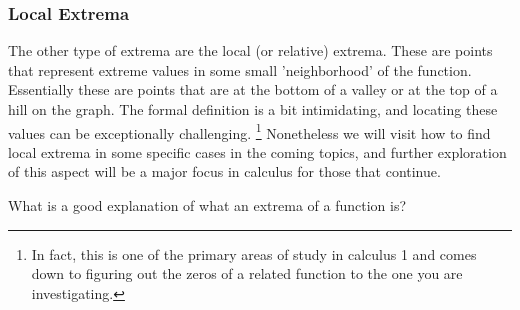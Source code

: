 \documentclass{ximera}
\begin{document}
    \subsubsection*{Local Extrema}
        The other type of extrema are the local (or relative) extrema. These are points that represent extreme values in some small 'neighborhood' of the function. Essentially these are points that are at the bottom of a valley or at the top of a hill on the graph. The formal definition is a bit intimidating, and locating these values can be exceptionally challenging.%
        \footnote{%
            In fact, this is one of the primary areas of study in calculus 1 and comes down to figuring out the zeros of a related function to the one you are investigating.%
            }
        Nonetheless we will visit how to find local extrema in some specific cases in the coming topics, and further exploration of this aspect will be a major focus in calculus for those that continue.
        
        
        \begin{problem}
            What is a good explanation of what an extrema of a function is?
            \begin{multipleChoice}
            \end{multipleChoice}
        \end{problem}
\end{document}
